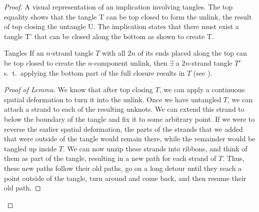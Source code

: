 \begin{paper}
\begin{proof}
{A visual representation of an implication involving tangles.
The top equality shows that the tangle T can be top closed to
form the unlink, the result of top closing the untangle U.
The implication states that there must exist a tangle T' that can be closed
along the bottom as shown to create T.}

\begin{paperlem}{Tangles}
If an $n$-strand tangle $T$ with all $2n$ of its ends placed along the top can
be top closed to create the $n$-component unlink, then $\exists$ a $2n$-strand
tangle $T'$ s.~t.~applying the bottom part of the full closure results in $T$
(see \figLemma).
\end{paperlem}

\begin{proof}[Proof of Lemma]
We know that after top closing $T$, we can apply a continuous spatial
deformation to turn it into the unlink.
Once we have untangled $T$, we can attach a strand to each of the resulting
unknots.
We can extend this strand to below the boundary of the tangle and fix it to some
arbitrary point.
If we were to reverse the earlier spatial deformation, the parts of the strands
that we added that were outside of the tangle would remain there, while the
remainder would be tangled up inside $T$.
We can now unzip these strands into ribbons, and think of them as part of the
tangle, resulting in a new path for each strand of $T$.
Thus, these new paths follow their old paths, go on a long detour until they
reach a point outside of the tangle, turn around and come back, and then resume
their old path.


\end{proof}
\end{proof}
\end{paper}
